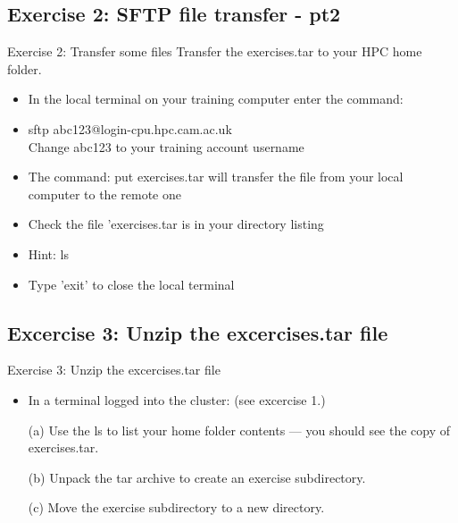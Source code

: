\subsection{Exercise 2: SFTP file transfer - pt2}
\begin{frame}{Exercise 2: Transfer some files}
Transfer the exercises.tar to your HPC home folder.
\begin{itemize}
\item{In the local terminal on your training computer enter the command:}
\item \alert{\footnotesize sftp abc123@login-cpu.hpc.cam.ac.uk}\\
Change abc123 to your training account username
\item{The command: \alert{\footnotesize put exercises.tar} will transfer the file from your local computer to the remote one}
\item{Check the file 'exercises.tar is in your directory listing}
\item{Hint: ls}
\item Type 'exit' to close the local terminal
\end{itemize}
\end{frame}

\subsection{Excercise 3: Unzip the excercises.tar file}
\begin{frame}{Exercise 3: Unzip the excercises.tar file}
  \begin{itemize}
\item{In a terminal logged into the cluster: (see excercise 1.)}
\item[(a)]{Use the \alert{ls} to list your home folder contents --- you should see the copy of exercises.tar.}

\item[(b)]{Unpack the tar archive to create an exercise subdirectory.}
\item[(c)]{Move the exercise subdirectory to a new directory.}
\end{itemize}
\end{frame}

